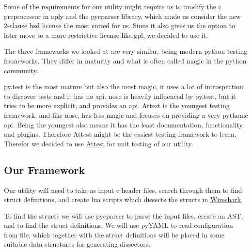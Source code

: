 \noindent Some of the requirements for our \gls{utility} might require us to modify
the \Gls{c} \gls{preprocessor} in \Gls{aply} and the \gls{pycparser} \gls{library}, which made us consider
the new 2-clause \Gls{bsd} license the most suited for us. Since it also gives us the
option to later move to a more restrictive license like \Gls{gpl}, we decided to use
it.

The three frameworks we looked at  are very similar, being modern \Gls{python}
testing frameworks. They differ in maturity and what is often called magic in
the \Gls{python} community.

py.test is the most mature but also the most magic, it uses a lot of
introspection to discover tests and it has no \Gls{api}. nose is heavily influenced
by py.test, but it tries to be more explicit, and provides an \Gls{api}. Attest is
the youngest testing framework, and like nose, has less magic and focuses on
providing a very pythonic \Gls{api}. Being the youngest also means it has the least
documentation, functionality and plugins. Therefore Attest might be the easiest
testing framework to learn. Therefor we decided to use
\hyperref[sec:pre:attest]{Attest} for unit testing of our \gls{utility}.

\subsection{Our Framework}
\label{sec:pre:framework}
Our \gls{utility} will need to take as input \Gls{c} \gls{header} files, search through them to
find \gls{struct} definitions, and create \Gls{lua} scripts which dissects the \glspl{struct} in
\hyperref[sec:pre:wireshark]{Wireshark}.

To find the \glspl{struct} we will use \gls{pycparser} to parse the input files, create an
\gls{AST}, and to find the \gls{struct} definitions. We will use pyYAML to
read configuration from file, which together with the \gls{struct} definitions will
be placed in some suitable data structures for generating \glspl{dissector}.

